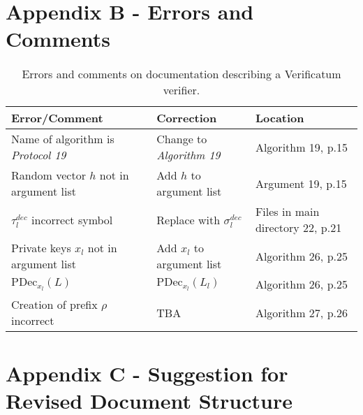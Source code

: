\clearpage
\section{Appendix B - Errors and Comments}

\begin{table}[h!]
\begin{tabular}{| p{3.5cm} | p{3.5cm} | p{3.5cm} |}
  \hline \bf{Error/Comment} & \bf{Correction} & \bf{Location} \\ \hline \hline

 Name of algorithm is
  \emph{Protocol 19} & Change to \emph{Algorithm 19} & Algorithm 19,
  p.15 \\ \hline

  Random vector $h$ not in argument list & Add $h$ to argument list &
  Argument 19, p.15 \\ \hline

  $\tau_l^{dec}$ incorrect symbol & Replace with $\sigma_l^{dec}$ &
  Files in main directory 22, p.21 \\ \hline

  Private keys $x_l$ not in argument list & Add $x_l$ to
  argument list & Algorithm 26, p.25 \\ \hline

  $\mathrm{PDec}_{x_l}(L)$ & $\mathrm{PDec}_{x_l}(L_l)$ & Algorithm
  26, p.25 \\ \hline

  Creation of prefix $\rho$ incorrect & TBA & Algorithm 27, p.26
  \\ \hline

\end{tabular}
\caption{Errors and comments on documentation describing a Verificatum verifier.}

\end{table}

\clearpage
\section{Appendix C - Suggestion for Revised Document Structure}

